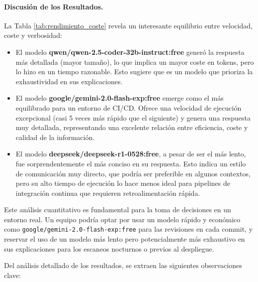 \paragraph{Discusión de los Resultados.}
La Tabla \ref{tab:rendimiento_coste} revela un interesante equilibrio entre velocidad, coste y verbosidad:
\begin{itemize}
    \item El modelo \textbf{qwen/qwen-2.5-coder-32b-instruct:free} generó la respuesta más detallada (mayor tamaño), lo que implica un mayor coste en tokens, pero lo hizo en un tiempo razonable. Esto sugiere que es un modelo que prioriza la exhaustividad en sus explicaciones.
    \item El modelo \textbf{google/gemini-2.0-flash-exp:free} emerge como el más equilibrado para un entorno de CI/CD. Ofrece una velocidad de ejecución excepcional (casi 5 veces más rápido que el siguiente) y genera una respuesta muy detallada, representando una excelente relación entre eficiencia, coste y calidad de la información.
    \item El modelo \textbf{deepseek/deepseek-r1-0528:free}, a pesar de ser el más lento, fue sorprendentemente el más conciso en su respuesta. Esto indica un estilo de comunicación muy directo, que podría ser preferible en algunos contextos, pero su alto tiempo de ejecución lo hace menos ideal para pipelines de integración continua que requieren retroalimentación rápida.
\end{itemize}

Este análisis cuantitativo es fundamental para la toma de decisiones en un entorno real. Un equipo podría optar por usar un modelo rápido y económico como \texttt{google/gemini-2.0-flash-exp:free} para las revisiones en cada commit, y reservar el uso de un modelo más lento pero potencialmente más exhaustivo en sus explicaciones para los escaneos nocturnos o previos al despliegue.


Del análisis detallado de los resultados, se extraen las siguientes observaciones clave:


